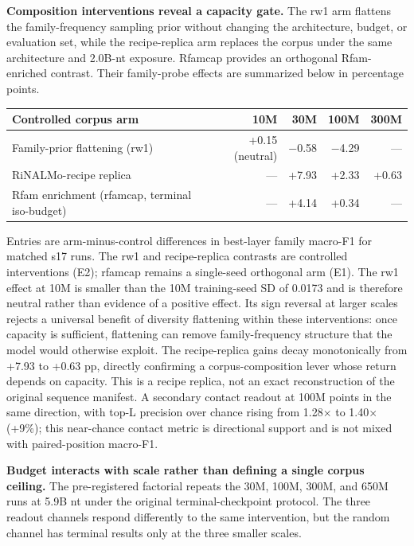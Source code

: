 \textbf{Composition interventions reveal a capacity gate.} The rw1 arm flattens the family-frequency sampling prior without changing the architecture, budget, or evaluation set, while the recipe-replica arm replaces the corpus under the same architecture and 2.0B-nt exposure. Rfamcap provides an orthogonal Rfam-enriched contrast. Their family-probe effects are summarized below in percentage points.

\begin{longtable}[]{@{}lrrrr@{}}
\toprule
Controlled corpus arm & 10M & 30M & 100M & 300M \\
\midrule
\endhead
Family-prior flattening (rw1) & +0.15 (neutral) & \(-\)0.58 & \(-\)4.29 & --- \\
RiNALMo-recipe replica & --- & +7.93 & +2.33 & +0.63 \\
Rfam enrichment (rfamcap, terminal iso-budget) & --- & +4.14 & +0.34 & --- \\
\bottomrule
\end{longtable}

Entries are arm-minus-control differences in best-layer family macro-F1 for matched s17 runs. The rw1 and recipe-replica contrasts are controlled interventions (E2); rfamcap remains a single-seed orthogonal arm (E1). The rw1 effect at 10M is smaller than the 10M training-seed SD of 0.0173 and is therefore neutral rather than evidence of a positive effect. Its sign reversal at larger scales rejects a universal benefit of diversity flattening within these interventions: once capacity is sufficient, flattening can remove family-frequency structure that the model would otherwise exploit. The recipe-replica gains decay monotonically from +7.93 to +0.63 pp, directly confirming a corpus-composition lever whose return depends on capacity. This is a recipe replica, not an exact reconstruction of the original sequence manifest. A secondary contact readout at 100M points in the same direction, with top-L precision over chance rising from 1.28\(\times\) to 1.40\(\times\) (+9\%); this near-chance contact metric is directional support and is not mixed with paired-position macro-F1.

\textbf{Budget interacts with scale rather than defining a single corpus ceiling.} The pre-registered factorial repeats the 30M, 100M, 300M, and 650M runs at 5.9B nt under the original terminal-checkpoint protocol. The three readout channels respond differently to the same intervention, but the random channel has terminal results only at the three smaller scales.

